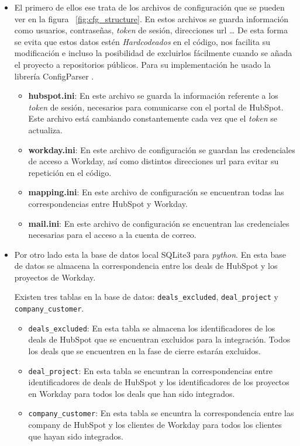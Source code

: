 \begin{itemize}[leftmargin=*]
\item El primero de ellos ese trata de los archivos de configuración que se pueden ver en la figura ~\ref{fig:cfg_structure}.
En estos archivos se guarda información como usuarios, contraseñas, \textit{token} de sesión, direcciones url \ldots
De esta forma se evita que estos datos estén \textit{Hardcodeados} en el código, nos facilita su modificación e
incluso la posibilidad de excluirlos fácilmente cuando se añada el proyecto a repositorios públicos.
Para su implementación he usado la librería ConfigParser \cite{ConfigParser}.



\begin{itemize}
	\item [\textendash] \textbf{hubspot.ini}: En este archivo se guarda la información referente a los \textit{token} de sesión, necesarios para comunicarse con el portal de HubSpot. 
	Este archivo está cambiando constantemente cada vez que el \textit{token} se actualiza.
	\item [\textendash] \textbf{workday.ini}: En este archivo de configuración se 
	guardan las credenciales de acceso a Workday, así como distintos direcciones url para evitar su repetición en el código.
	\item [\textendash] \textbf{mapping.ini}: En este archivo de configuración se encuentran todas las correspondencias entre HubSpot y Workday.
	\item [\textendash] \textbf{mail.ini}: En este archivo de configuración se encuentran las credenciales necesarias para el acceso a la cuenta de correo.
\end{itemize}




\item Por otro lado esta la base de datos local SQLite3 \cite{sqlite3} para \textit{python}.
 En esta base de datos se almacena la correspondencia entre los deals de HubSpot y los proyectos de Workday.
 
 Existen tres tablas en la base de datos: \verb|deals_excluded|, \verb|deal_project| y \verb|company_customer|.
 
 
 \begin{itemize}
	\item \verb|deals_excluded|: En esta tabla se almacena los identificadores de los deals de HubSpot 
	que se encuentran excluidos para la integración. Todos los deals que se encuentren en la fase de
	cierre estarán excluidos.
	\item \verb|deal_project|: En esta tabla se encuntran la correspondencias entre identificadores 
	de deals de HubSpot y los identificadores de los proyectos en Workday para todos los deals que han sido integrados.
	\item \verb|company_customer|: En esta tabla se encuntra la correspondencia entre las company de HubSpot y los clientes de Workday
	para todos los clientes que hayan sido integrados.
 \end{itemize}
 

\end{itemize}
